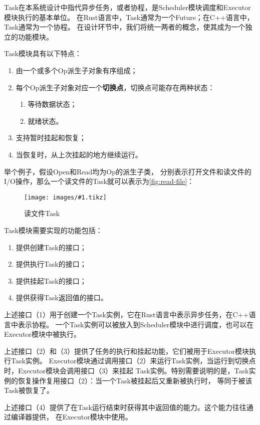 \documentclass[supercite]{HustGraduPaper}
\newcommand{\cfig}[3]{
  \begin{figure}[htb]
    \centering
    \texttt{[image: images/\#1.tikz]}
    \caption{#3}
    \label{fig:#1}
  \end{figure}
}
\newcommand{\rfig}[1]{\autoref{fig:#1}}
\theoremstyle{definition}
\begin{document}
Task在本系统设计中指代异步任务，或者协程，是Scheduler模块调度和Executor模块执行的基本单位。
在Rust语言中，Task通常为一个Future；在C++语言中，Task通常为一个协程。
在设计环节中，我们将统一两者的概念，使其成为一个独立的功能模块。\par

Task模块具有以下特点：
\begin{enumerate}
  \item 由一个或多个Op派生子对象有序组成；
  \item 每个Op派生子对象对应一个\textbf{切换点}，切换点可能存在两种状态：
    \begin{enumerate}
      \item 等待数据状态；
      \item 就绪状态。
    \end{enumerate}
  \item 支持暂时挂起和恢复；
  \item 当恢复时，从上次挂起的地方继续运行。
\end{enumerate}

举个例子，假设Open和Read均为Op的派生子类，
分别表示打开文件和读文件的I/O操作，那么一个读文件的Task就可以表示为\rfig{read-file}：

\cfig{read-file}{0.4}{读文件Task}

Task模块需要实现的功能包括：

\begin{enumerate}
  \item 提供创建Task的接口；
  \item 提供执行Task的接口；
  \item 提供挂起Task的接口；
  \item 提供获得Task返回值的接口。
\end{enumerate}

上述接口（1）用于创建一个Task实例，它在Rust语言中表示异步任务，在C++语言中表示协程。
一个Task实例可以被放入到Scheduler模块中进行调度，也可以在Executor模块中被执行。\par

上述接口（2）和（3）提供了任务的执行和挂起功能，它们被用于Executor模块执行Task实例。
Executor模块通过调用接口（2）来运行Task实例，当运行到切换点时，Executor模块会调用接口（3）来挂起
Task实例。特别需要说明的是，Task实例的恢复操作复用接口（2）：当一个Task被挂起后又重新被执行时，
等同于被该Task被恢复了。\par

上述接口（4）提供了在Task运行结束时获得其中返回值的能力。这个能力往往通过编译器提供，
在Executor模块中使用。\par
\end{document}
